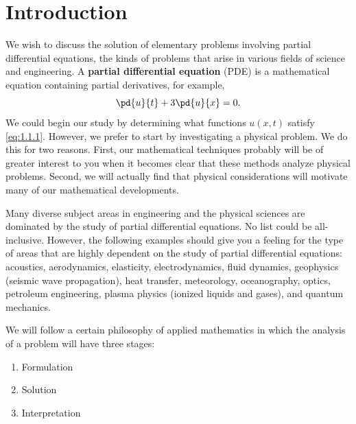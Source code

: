 
\section{Introduction}
\label{sec:1.1}

We wish to discuss the solution of elementary problems involving partial differential equations, the kinds of problems that arise in various fields of science and engineering. A \textbf{partial differential equation} (PDE) is a mathematical equation containing partial derivatives, for example,
\begin{equation}
\pd{u}{t} + 3\pd{u}{x} = 0.
\label{eq:1.1.1}
\end{equation}
We could begin our study by determining what functions $u(x,t)$ satisfy \eqref{eq:1.1.1}. However, we prefer to start by investigating a physical problem. We do this for two reasons. First, our mathematical techniques probably will be of greater interest to you when it becomes clear that these methods analyze physical problems. Second, we will actually find that physical considerations will motivate many of our mathematical developments.

Many diverse subject areas in engineering and the physical sciences are dominated by the study of partial differential equations. No list could be all-inclusive. However, the following examples should give you a feeling for the type of areas that are highly dependent on the study of partial differential equations: acoustics, aerodynamics, elasticity, electrodynamics, fluid dynamics, geophysics (seismic wave propagation), heat transfer, meteorology, oceanography, optics, petroleum engineering, plasma physics (ionized liquids and gases), and quantum mechanics.

We will follow a certain philosophy of applied mathematics in which the analysis of a problem will have three stages:
\begin{enumerate}
\item Formulation
\item Solution
\item Interpretation
\end{enumerate}

